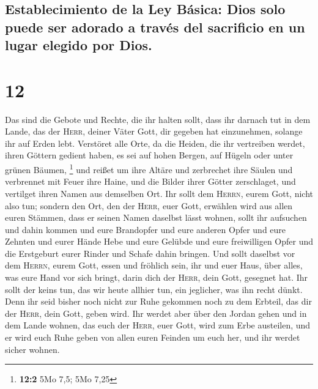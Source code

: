 \hypertarget{establecimiento-de-la-ley-buxe1sica-dios-solo-puede-ser-adorado-a-travuxe9s-del-sacrificio-en-un-lugar-elegido-por-dios.}{%
\subsection{Establecimiento de la Ley Básica: Dios solo puede ser
adorado a través del sacrificio en un lugar elegido por
Dios.}\label{establecimiento-de-la-ley-buxe1sica-dios-solo-puede-ser-adorado-a-travuxe9s-del-sacrificio-en-un-lugar-elegido-por-dios.}}

\hypertarget{section-11}{%
\section{12}\label{section-11}}

 Das sind die Gebote und Rechte, die ihr halten sollt,
dass ihr darnach tut in dem Lande, das der \textsc{Herr}, deiner Väter
Gott, dir gegeben hat einzunehmen, solange ihr auf Erden lebt.
 Verstöret alle Orte, da die Heiden, die ihr vertreiben
werdet, ihren Göttern gedient haben, es sei auf hohen Bergen, auf Hügeln
oder unter grünen Bäumen, \footnote{\textbf{12:2} 5Mo 7,5; 5Mo 7,25}
 und reißet um ihre Altäre und zerbrechet ihre Säulen und
verbrennet mit Feuer ihre Haine, und die Bilder ihrer Götter
zerschlaget, und vertilget ihren Namen aus demselben Ort. 
Ihr sollt dem \textsc{Herrn}, eurem Gott, nicht also tun; 
sondern den Ort, den der \textsc{Herr}, euer Gott, erwählen wird aus
allen euren Stämmen, dass er seinen Namen daselbst lässt wohnen, sollt
ihr aufsuchen und dahin kommen  und eure Brandopfer und
eure anderen Opfer und eure Zehnten und eurer Hände Hebe und eure
Gelübde und eure freiwilligen Opfer und die Erstgeburt eurer Rinder und
Schafe dahin bringen.  Und sollt daselbst vor dem
\textsc{Herrn}, eurem Gott, essen und fröhlich sein, ihr und euer Haus,
über alles, was eure Hand vor sich bringt, darin dich der \textsc{Herr},
dein Gott, gesegnet hat.  Ihr sollt der keins tun, das wir
heute allhier tun, ein jeglicher, was ihn recht dünkt. 
Denn ihr seid bisher noch nicht zur Ruhe gekommen noch zu dem Erbteil,
das dir der \textsc{Herr}, dein Gott, geben wird.  Ihr
werdet aber über den Jordan gehen und in dem Lande wohnen, das euch der
\textsc{Herr}, euer Gott, wird zum Erbe austeilen, und er wird euch Ruhe
geben von allen euren Feinden um euch her, und ihr werdet sicher wohnen.
